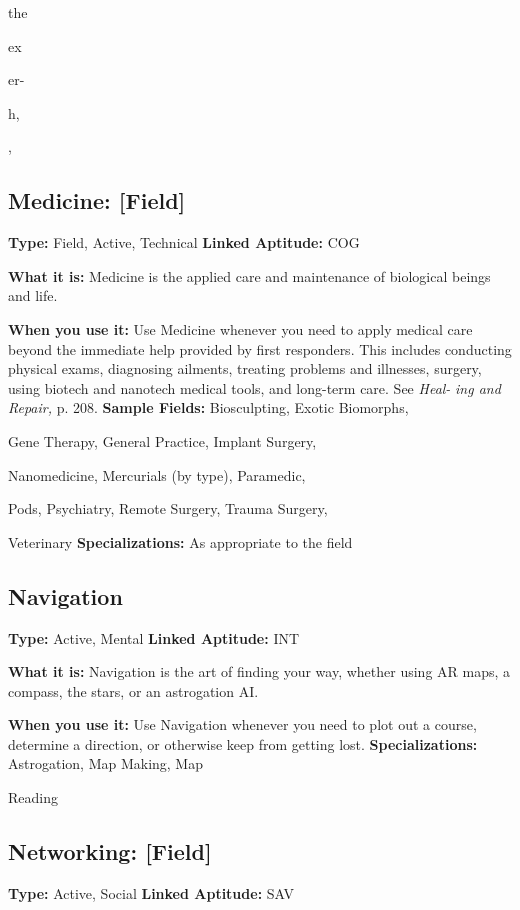 the

ex

er-

h, 

,

\subsection{Medicine: [Field]}

\textbf{Type:} Field, Active, Technical
\textbf{Linked Aptitude:} COG

\textbf{What it is:} Medicine is the applied care and maintenance
of biological beings and life.

\textbf{When you use it:} Use Medicine whenever you need 
to apply medical care beyond the immediate help 
provided by first responders. This includes conducting
physical exams, diagnosing ailments, treating
problems and illnesses, surgery, using biotech and 
nanotech medical tools, and long-term care. See \textit{Heal-}
\textit{ing and Repair,} p. 208.
\textbf{Sample Fields:} Biosculpting, Exotic Biomorphs, 

Gene Therapy, General Practice, Implant Surgery, 

Nanomedicine, Mercurials (by type), Paramedic, 

Pods, Psychiatry, Remote Surgery, Trauma Surgery, 

Veterinary
\textbf{Specializations:} As appropriate to the field

\subsection{Navigation}

\textbf{Type:} Active, Mental
\textbf{Linked Aptitude:} INT

\textbf{What it is:} Navigation is the art of finding your way, 
whether using AR maps, a compass, the stars, or an 
astrogation AI.

\textbf{When you use it:} Use Navigation whenever you 
need to plot out a course, determine a direction, or 
otherwise keep from getting lost.
\textbf{Specializations:} Astrogation, Map Making, Map 

Reading

\subsection{Networking: [Field]}

\textbf{Type:} Active, Social
\textbf{Linked Aptitude:} SAV

